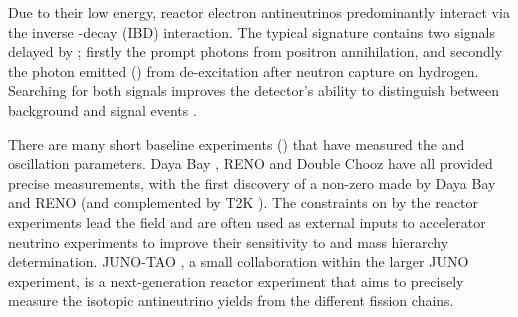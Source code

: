 Due to their low energy, reactor electron antineutrinos predominantly interact via the inverse \quickmath{\beta}-decay (IBD) interaction. The typical signature contains two signals delayed by ; firstly the prompt photons from positron annihilation, and secondly the photon emitted () from de-excitation after neutron capture on hydrogen. Searching for both signals improves the detector's ability to distinguish between background and signal events \cite{Abe2022-ij}. %

There are many short baseline experiments () that have measured the  and  oscillation parameters. Daya Bay \cite{PhysRevLett.108.171803}, RENO \cite{PhysRevLett.108.191802} and Double Chooz \cite{PhysRevLett.108.131801} have all provided precise measurements, with the first discovery of a non-zero  made by Daya Bay and RENO (and complemented by T2K \cite{PhysRevLett.108.131801}). The constraints on  by the reactor experiments lead the field and are often used as external inputs to accelerator neutrino experiments to improve their sensitivity to  and mass hierarchy determination.
JUNO-TAO \cite{junocollaboration2020tao}, a small collaboration within the larger JUNO experiment, is a next-generation reactor experiment that aims to precisely measure the isotopic antineutrino yields from the different fission chains. %

